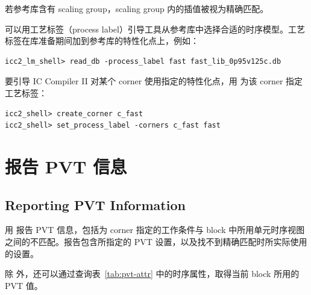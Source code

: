 \begin{noteBox}
若参考库含有 scaling group，scaling group 内的插值被视为精确匹配。
\end{noteBox}

可以用工艺标签（process label）引导工具从参考库中选择合适的时序模型。工艺标签在库准备期间加到参考库的特性化点上，例如：
\begin{lstlisting}
icc2_lm_shell> read_db -process_label fast fast_lib_0p95v125c.db
\end{lstlisting}

要引导 IC Compiler II 对某个 corner 使用指定的特性化点，用  为该 corner 指定工艺标签：
\begin{lstlisting}
icc2_shell> create_corner c_fast
icc2_shell> set_process_label -corners c_fast fast
\end{lstlisting}

\section{报告 PVT 信息}
\subsection*{Reporting PVT Information}

用  报告 PVT 信息，包括为 corner 指定的工作条件与 block 中所用单元时序视图之间的不匹配。报告包含所指定的 PVT 设置，以及找不到精确匹配时所实际使用的设置。

除  外，还可以通过查询表~\ref{tab:pvt-attr} 中的时序属性，取得当前 block 所用的 PVT 值。

